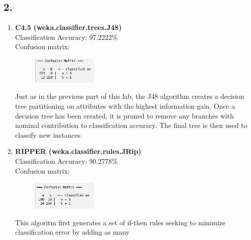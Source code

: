 \documentclass{article}
\begin{document}
    \subsection*{2.}
    
    \begin{enumerate}[label = (\alph*), left=10pt, itemsep=10pt]
        
        \item \begin{minipage}[t]{0.9\textwidth}
            \textbf{C4.5 (weka.classifier.trees.J48)}\\
             Classification Accuracy: 97.2222\%\\
             Confusion matrix:\\
             \begin{figure}[H]
                \includegraphics[width=0.3\textwidth, height=0.1\textheight]{./6a2.png}
            \end{figure}
            Just as in the previous part of this lab, the J48 algorithm creates a decision tree partitioning
            on attributes with the highest information gain. Once a decision tree has been created, it is pruned
            to remove any branches with nominal contribution to classification accuracy. The final tree 
            is then used to classify new instances. 
        \end{minipage}
        \item \begin{minipage}[t]{0.9\textwidth}
            \textbf{RIPPER (weka.classifier.rules.JRip)}\\
             Classification Accuracy: 90.2778\%\\
             Confusion matrix:\\
             \begin{figure}[H]
                \includegraphics[width=0.3\textwidth, height=0.1\textheight]{./6b2.png}
            \end{figure}
            This algoritm first generates a set of if-then rules seeking to minimize classification error by adding as many

\end{minipage}
\end{enumerate}
\end{document}

